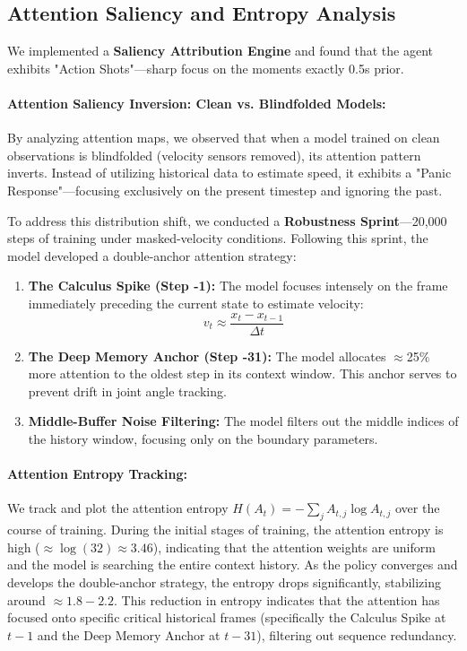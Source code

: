 \documentclass[11pt,a4paper]{article}
\begin{document}
\subsection{Attention Saliency and Entropy Analysis}
We implemented a \textbf{Saliency Attribution Engine} and found that the agent exhibits "Action Shots"---sharp focus on the moments exactly 0.5s prior.

\paragraph{Attention Saliency Inversion: Clean vs. Blindfolded Models:}
By analyzing attention maps, we observed that when a model trained on clean observations is blindfolded (velocity sensors removed), its attention pattern inverts. Instead of utilizing historical data to estimate speed, it exhibits a "Panic Response"---focusing exclusively on the present timestep and ignoring the past.

To address this distribution shift, we conducted a \textbf{Robustness Sprint}---20,000 steps of training under masked-velocity conditions. Following this sprint, the model developed a double-anchor attention strategy:
\begin{enumerate}
    \item \textbf{The Calculus Spike (Step -1):} The model focuses intensely on the frame immediately preceding the current state to estimate velocity:
    \begin{equation}
    v_t \approx \frac{x_t - x_{t-1}}{\Delta t}
    \end{equation}
    \item \textbf{The Deep Memory Anchor (Step -31):} The model allocates $\approx$25\% more attention to the oldest step in its context window. This anchor serves to prevent drift in joint angle tracking.
    \item \textbf{Middle-Buffer Noise Filtering:} The model filters out the middle indices of the history window, focusing only on the boundary parameters.
\end{enumerate}

\paragraph{Attention Entropy Tracking:}
We track and plot the attention entropy $H(A_t) = -\sum_j A_{t,j} \log A_{t,j}$ over the course of training. During the initial stages of training, the attention entropy is high ($\approx \log(32) \approx 3.46$), indicating that the attention weights are uniform and the model is searching the entire context history. As the policy converges and develops the double-anchor strategy, the entropy drops significantly, stabilizing around $\approx 1.8 - 2.2$. This reduction in entropy indicates that the attention has focused onto specific critical historical frames (specifically the Calculus Spike at $t-1$ and the Deep Memory Anchor at $t-31$), filtering out sequence redundancy.
\end{document}
